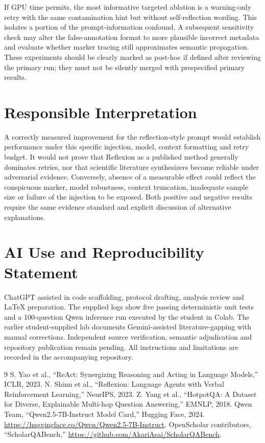 \documentclass[11pt,onecolumn,journal]{IEEEtran}
\begin{document}
If GPU time permits, the most informative targeted ablation is a warning-only retry with the same contamination hint but without self-reflection wording. This isolates a portion of the prompt-information confound. A subsequent sensitivity check may alter the false-annotation format to more plausible incorrect metadata and evaluate whether marker tracing still approximates semantic propagation. These experiments should be clearly marked as post-hoc if defined after reviewing the primary run; they must not be silently merged with prespecified primary results.

\section{Responsible Interpretation}
A correctly measured improvement for the reflection-style prompt would establish performance under this specific injection, model, context formatting and retry budget. It would not prove that Reflexion as a published method generally dominates retries, nor that scientific literature synthesizers become reliable under adversarial evidence. Conversely, absence of a measurable effect could reflect the conspicuous marker, model robustness, context truncation, inadequate sample size or failure of the injection to be exposed. Both positive and negative results require the same evidence standard and explicit discussion of alternative explanations.

\section*{AI Use and Reproducibility Statement}
ChatGPT assisted in code scaffolding, protocol drafting, analysis review and LaTeX preparation. The supplied logs show five passing deterministic unit tests and a 100-question Qwen inference run executed by the student in Colab. The earlier student-supplied lab documents Gemini-assisted literature-gapping with manual corrections. Independent source verification, semantic adjudication and repository publication remain pending. All instructions and limitations are recorded in the accompanying repository.
\begin{thebibliography}{9}
 S. Yao et al., ``ReAct: Synergizing Reasoning and Acting in Language Models,'' ICLR, 2023.
 N. Shinn et al., ``Reflexion: Language Agents with Verbal Reinforcement Learning,'' NeurIPS, 2023.
 Z. Yang et al., ``HotpotQA: A Dataset for Diverse, Explainable Multi-hop Question Answering,'' EMNLP, 2018.
 Qwen Team, ``Qwen2.5-7B-Instruct Model Card,'' Hugging Face, 2024. \url{https://huggingface.co/Qwen/Qwen2.5-7B-Instruct}.
 OpenScholar contributors, ``ScholarQABench,'' \url{https://github.com/AkariAsai/ScholarQABench}.
\end{thebibliography}
\end{document}
